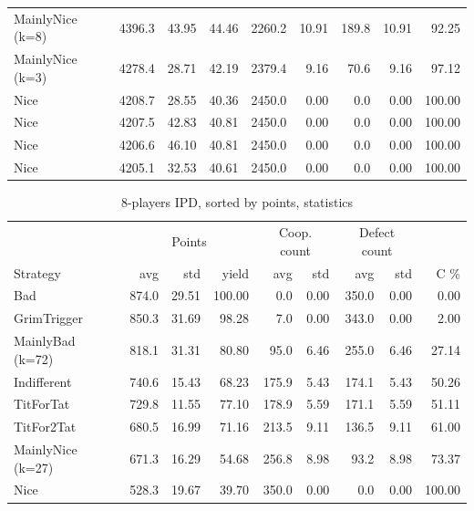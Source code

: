 \documentclass[journal,a4paper,10pt,twoside]{IEEEtran} %
\begin{document}
\begin{table}[ht]
\begin{tabular}{l|rrr|rrrrr}
		MainlyNice (k=8)  & 4396.3 & 43.95 &     44.46 & 2260.2 &                  10.91 &  189.8 &                   10.91 &  92.25 \\
		MainlyNice (k=3)  & 4278.4 & 28.71 &     42.19 & 2379.4 &                   9.16 &   70.6 &                    9.16 &  97.12 \\
		Nice              & 4208.7 & 28.55 &     40.36 & 2450.0 &                   0.00 &    0.0 &                    0.00 & 100.00 \\
		Nice              & 4207.5 & 42.83 &     40.81 & 2450.0 &                   0.00 &    0.0 &                    0.00 & 100.00 \\
		Nice              & 4206.6 & 46.10 &     40.81 & 2450.0 &                   0.00 &    0.0 &                    0.00 & 100.00 \\
		Nice              & 4205.1 & 32.53 &     40.61 & 2450.0 &                   0.00 &    0.0 &                    0.00 & 100.00 \\ \bottomrule
	\end{tabular}
\end{table}

\begin{table}[ht]
   	\caption{8-players IPD, sorted by points, statistics}
   	\label{tab:ipdmp8}
   	\centering
    \begin{tabular}{l|rrr|rrrrr} \toprule
    	                  & \multicolumn{3}{c}{Points} & \multicolumn{2}{c}{Coop. count} & \multicolumn{2}{c}{Defect count} &        \\
    	Strategy          &   avg &   std &      yield &   avg &                     std &   avg &                      std &   C \% \\ \midrule
    	Bad               & 874.0 & 29.51 &     100.00 &   0.0 &                    0.00 & 350.0 &                     0.00 &   0.00 \\
    	GrimTrigger       & 850.3 & 31.69 &      98.28 &   7.0 &                    0.00 & 343.0 &                     0.00 &   2.00 \\
    	MainlyBad (k=72)  & 818.1 & 31.31 &      80.80 &  95.0 &                    6.46 & 255.0 &                     6.46 &  27.14 \\
    	Indifferent       & 740.6 & 15.43 &      68.23 & 175.9 &                    5.43 & 174.1 &                     5.43 &  50.26 \\
    	TitForTat         & 729.8 & 11.55 &      77.10 & 178.9 &                    5.59 & 171.1 &                     5.59 &  51.11 \\
    	TitFor2Tat        & 680.5 & 16.99 &      71.16 & 213.5 &                    9.11 & 136.5 &                     9.11 &  61.00 \\
    	MainlyNice (k=27) & 671.3 & 16.29 &      54.68 & 256.8 &                    8.98 &  93.2 &                     8.98 &  73.37 \\
    	Nice              & 528.3 & 19.67 &      39.70 & 350.0 &                    0.00 &   0.0 &                     0.00 & 100.00 \\ \bottomrule
    \end{tabular}
\end{table}
\end{document}
